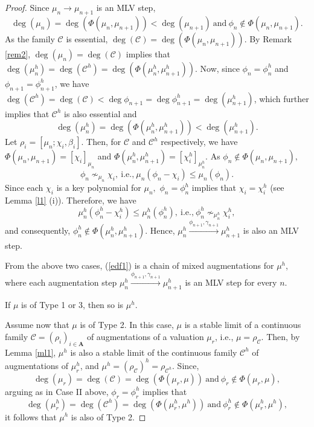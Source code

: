 \documentclass[11pt]{amsart}
\theoremstyle{definition}
\theoremstyle{remark}
\numberwithin{equation}{section}
\begin{document}
\begin{proof}
 		 Since $\mu_n\longrightarrow \mu_{n+1}$ is an MLV step, \[\deg(\mu_n)=\deg(\Phi(\mu_n,\mu_{n+1}))<\deg(\mu_{n+1})\  \text{and}\  \phi_n\nin \Phi(\mu_n,\mu_{n+1}).\] As the family $\mathcal{C}$ is essential, $\deg(\mathcal{C})=\deg(\Phi(\mu_n,\mu_{n+1})).$ By Remark \ref{rem2}, $\deg(\mu_n)=\deg(\mathcal{C})$ implies that $\deg(\mu_n^h)=\deg(\mathcal{C}^h)=\deg(\Phi(\mu_n^h,\mu_{n+1}^h)).$ Now, since $\phi_n=\phi_n^h$ and $\phi_{n+1}=\phi_{n+1}^h$, we have $\deg(\mathcal{C}^h)=\deg(\mathcal{C})<\deg\phi_{n+1}=\deg\phi_{n+1}^h=\deg(\mu_{n+1}^h)$, which further implies that $\mathcal{C}^h$ is also essential and \[\deg(\mu_n^h)=\deg(\Phi(\mu_n^h,\mu_{n+1}^h))<\deg(\mu_{n+1}^h).\] Let $\rho_i=[\mu_n;\chi_i,\beta_i].$ Then, for $\mathcal{C}$ and $\mathcal{C}^h$ respectively, we have $\Phi(\mu_n,\mu_{n+1})=[\chi_i]_{\mu_n}$ and $\Phi(\mu_n^h,\mu_{n+1}^h)=[\chi_i^h]_{\mu_n^h}$. As $\phi_n\nin \Phi(\mu_n,\mu_{n+1}),$ \[\phi_n\nsim_{\mu_n}\chi_i,\ \text{i.e.,}\  \mu_n(\phi_n-\chi_i)\leq \mu_n(\phi_n).\] Since each $\chi_i$ is a key polynomial for $\mu_n,$ $\phi_n=\phi_n^h$ implies that $\chi_i=\chi_i^h$ (see Lemma \ref{l1} (i)). Therefore, we have \[\mu_n^h(\phi_n^h-\chi_i^h)\leq \mu_n^h(\phi_n^h),\ \text{i.e.,}\  \phi_n^h\nsim_{\mu_n^h}\chi_i^h,\] and consequently, $\phi_n^h\nin \Phi(\mu_n^h,\mu_{n+1}^h).$ Hence, $\mu_n^h\xrightarrow{\phi_{n+1},\gamma_{n+1}} \mu_{n+1}^h$ is also an MLV step.
 		 \smallskip
 		
 		From the above two cases, (\ref{edf1}) is a chain of mixed augmentations for $\mu^h$, where each augmentation step $\mu_{n}^h\xrightarrow{\phi_{n+1},\gamma_{n+1}} \mu_{n+1}^h$ is an MLV step for every $n$. 
 		
 		If $\mu$ is of Type 1 or 3, then so is $\mu^h$.
 		
 		 Assume now that $\mu$ is of Type 2. In this case, $\mu$ is a stable limit of a continuous family  $\mathcal{C}=(\rho_i)_{i\in\mathbf{A}}$ of augmentations of a valuation $\mu_r$, i.e., $\mu=\rho_{\mathcal{C}}.$ Then, by Lemma \ref{ml1}, $\mu^h$ is also a stable limit of the continuous family $\mathcal{C}^h$ of augmentations of $\mu_r^h$, and $\mu^h=(\rho_\mathcal{C})^h=\rho_{\mathcal{C}^h}$. Since, \[\deg(\mu_r)=\deg(\mathcal{C})=\deg(\Phi(\mu_r,\mu))\  \text{and}\  \phi_r\nin\Phi(\mu_r,\mu),\] arguing as in Case II above, $\phi_r=\phi_r^h$ implies that \[\deg(\mu_r^h)=\deg(\mathcal{C}^h)=\deg(\Phi(\mu_r^h,\mu^h))\ \text{and}\ \phi_r^h\nin\Phi(\mu_r^h,\mu^h),\] it follows that $\mu^h$ is also of Type 2.
 	\end{proof}
 
\end{document}
